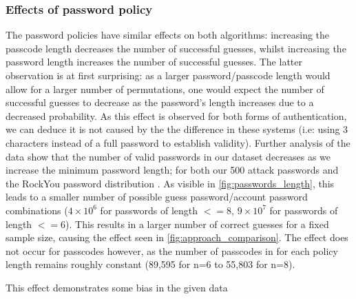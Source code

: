 \documentclass[british,10pt,a4paper]{article}
\begin{document}
\subsubsection{Effects of password policy}
The password policies have similar effects on both algorithms: increasing the passcode length decreases the number of successful guesses, whilst increasing the password length increases the number of successful guesses. The latter observation is at first surprising: as a larger password/passcode length would allow for a larger number of permutations, one would expect the number of successful guesses to decrease as the password's length increases due to a decreased probability. As this effect is observed for both forms of authentication, we can deduce it is not caused by the the difference in these systems (i.e: using 3 characters instead of a full password to establish validity). Further analysis of the data show that the number of valid passwords in our dataset decreases as we increase the minimum password length; for both our 500 attack passwords and the RockYou password distribution \cite{rockyoupasswords}. As visible in \autoref{fig:passwords_length}, this leads to a smaller number of possible guess password/account password combinations ($4 \times 10^6 $ for  passwords  of length $<= 8$, $9 \times 10^7$ for passwords of length $<= 6$). This results in a larger number of correct guesses for a fixed sample size, causing the effect seen in \autoref{fig:approach_comparison}. The effect does not occur for passcodes however, as the number of passcodes in \cite{rockyoupasswords} for each policy length remains roughly constant (89,595 for n=6 to 55,803 for n=8).

This effect demonstrates some bias in the given data 


\end{document}
